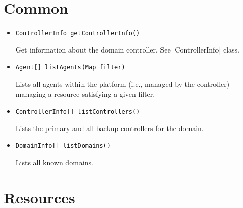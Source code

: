 \documentclass[a4paper]{report}
\newenvironment{Api}{\begin{itemize}}{\end{itemize}}
\newcommand{\ApiCode}[1]{\lstinline[style=styleApi]|#1|}
\newcommand{\ApiItem}[1]{\item #1 %

}
\newcommand{\ApiCmd}[1]{\ApiItem{\ApiCode{#1}}}
\begin{document}
\section{Common}

\begin{Api}

\ApiCmd{ControllerInfo getControllerInfo()}
Get information about the domain controller. See |ControllerInfo| class.

\ApiCmd{Agent[] listAgents(Map filter)}
Lists all agents within the platform (i.e., managed by the controller) managing a resource satisfying a given filter.

\ApiCmd{ControllerInfo[] listControllers()}
Lists the primary and all backup controllers for the domain.

\ApiCmd{DomainInfo[] listDomains()}
Lists all known domains.

\end{Api}


\section{Resources}
\end{document}
